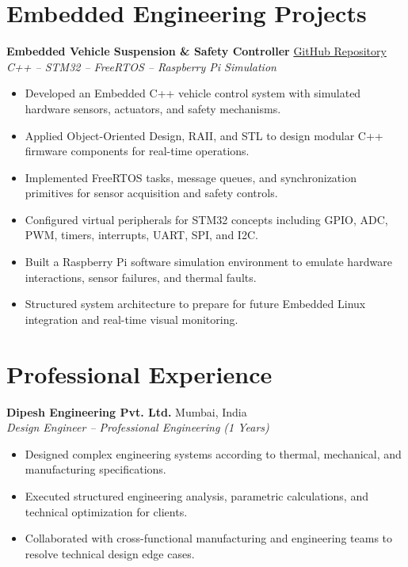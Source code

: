 \documentclass[10pt, a4paper]{article}
\begin{document}
\section{Embedded Engineering Projects}
\textbf{Embedded Vehicle Suspension \& Safety Controller} \hfill \href{https://github.com/ashu304-ops/project1}{GitHub Repository} \\
\textit{C++ -- STM32 -- FreeRTOS -- Raspberry Pi Simulation}
\begin{itemize}
    \item Developed an Embedded C++ vehicle control system with simulated hardware sensors, actuators, and safety mechanisms.
    \item Applied Object-Oriented Design, RAII, and STL to design modular C++ firmware components for real-time operations.
    \item Implemented FreeRTOS tasks, message queues, and synchronization primitives for sensor acquisition and safety controls.
    \item Configured virtual peripherals for STM32 concepts including GPIO, ADC, PWM, timers, interrupts, UART, SPI, and I2C.
    \item Built a Raspberry Pi software simulation environment to emulate hardware interactions, sensor failures, and thermal faults.
    \item Structured system architecture to prepare for future Embedded Linux integration and real-time visual monitoring.
\end{itemize}

\section{Professional Experience}
\textbf{Dipesh Engineering Pvt. Ltd.} \hfill Mumbai, India \\
\textit{Design Engineer -- Professional Engineering (1 Years)}
\begin{itemize}
    \item Designed complex engineering systems according to thermal, mechanical, and manufacturing specifications.
    \item Executed structured engineering analysis, parametric calculations, and technical optimization for clients.
    \item Collaborated with cross-functional manufacturing and engineering teams to resolve technical design edge cases.
\end{itemize}
\end{document}
